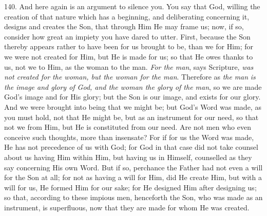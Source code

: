 140. And here again is an
argument to silence you. You say that God, willing the creation of
that nature which has a beginning, and deliberating concerning it,
designs and creates the Son, that through Him He may frame us; now, if
so, consider how great an impiety you have dared to utter. First,
because the Son thereby appears rather to have been for us brought to
be, than we for Him; for we were not created for Him, but He is made
for us; so that He owes thanks to us, not we to Him, as the woman to
the man. \emph{For the man}, says Scripture, \emph{was not created for
the woman, but the woman for the man}. Therefore as \emph{the}
\emph{man} \emph{is the image and glory of God, and the woman the
glory of the man}, so we are made God's image and for His glory;
but the Son is our image, and exists for our glory. And we were
brought into being that we might be; but God's Word was made, as you
must hold, not that He might be, but as an instrument for our need, so
that not we from Him, but He is constituted from our need. Are not men
who even conceive such thoughts, more than insensate? For if for us
the Word was made, He has not precedence of us with God; for God in
that case did not take counsel about us having Him within Him, but
having us in Himself, counselled as they say concerning His own Word.
But if so, perchance the Father had not even a will for the Son at
all; for not as having a will for Him, did He create Him, but
with a will for us, He formed Him for our sake; for He designed Him
after designing us; so that, according to these impious men,
henceforth the Son, who was made as an instrument, is superfluous, now
that they are made for whom He was created.

